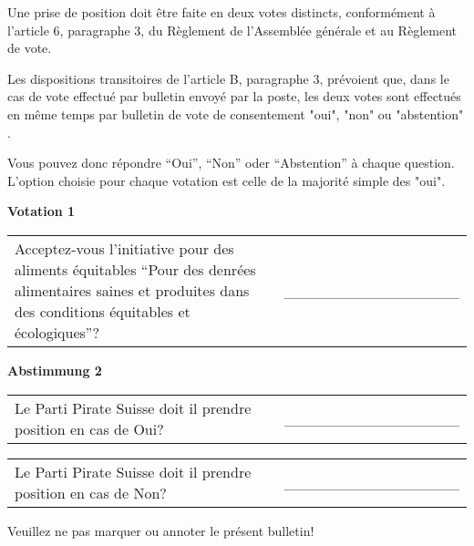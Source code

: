\documentclass[11pt, a4paper]{scrartcl}
\begin{document}
{\begin{minipage}[t][12.5cm][t]{17.7cm}
\vspace{0.1cm}
Une prise de position doit être faite en deux votes distincts, conformément à l'article 6, paragraphe 3, du Règlement de l'Assemblée générale et au Règlement de vote.

Les dispositions transitoires de l'article B, paragraphe 3, prévoient que, dans le cas de vote effectué par bulletin envoyé par la poste, les deux votes sont effectués en même temps par bulletin de vote de consentement "oui", "non" ou "abstention" .

\vspace{0.1cm}
Vous pouvez donc répondre \enquote{Oui}, \enquote{Non} oder \enquote{Abstention} à chaque question. L'option choisie pour chaque votation est celle de la majorité simple des "oui".

\vspace{1cm}

\textbf{Votation 1}

\vspace{0.5cm}

\begin{tabular}{ b{13.5cm} b{3cm} }
Acceptez-vous l'initiative pour des aliments équitables \enquote{Pour des denrées alimentaires saines et produites dans des conditions équitables et écologiques}?
& \_\_\_\_\_\_\_\_\_\_\_\_\_\_\_\_ \\
\end{tabular}

\vspace{0.5cm}

\textbf{Abstimmung 2}

\vspace{0.5cm}

\begin{tabular}{ b{13.5cm} b{3cm} }
Le Parti Pirate Suisse doit il prendre position en cas de Oui?
& \_\_\_\_\_\_\_\_\_\_\_\_\_\_\_\_ \\
\end{tabular}

\vspace{0.5cm}

\begin{tabular}{ b{13.5cm} b{3cm} }
Le Parti Pirate Suisse doit il prendre position en cas de Non?
& \_\_\_\_\_\_\_\_\_\_\_\_\_\_\_\_ \\
\end{tabular}

\vspace{0.5cm}

Veuillez ne pas marquer ou annoter le présent bulletin!



\end{minipage}}
\end{document}
